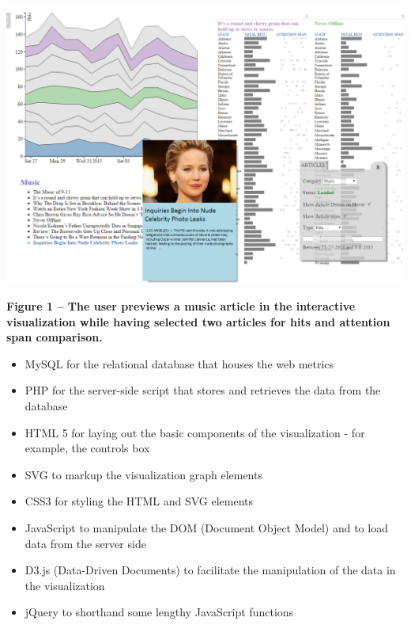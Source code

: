 \documentclass[12pt]{article}
\begin{document}
\noindent\includegraphics[scale=0.4]{img/in_action} \\

\begin{singlespace}
\noindent\textbf{Figure 1 -- The user previews a music article in the interactive visualization while having selected two articles for hits and attention span comparison.}
\end{singlespace}

\newpage

\iffalse

\begin{itemize}
\item MySQL for the relational database that houses the web metrics
\item PHP for the server-side script that stores and retrieves the data from the database
\item HTML 5 for laying out the basic components of the visualization - for example, the controls box
\item SVG to markup the visualization graph elements
\item CSS3 for styling the HTML and SVG elements
\item JavaScript to manipulate the DOM (Document Object Model) and to load data from the server side
\item D3.js (Data-Driven Documents) to facilitate the manipulation of the data in the visualization
\item jQuery to shorthand some lengthy JavaScript functions
\end{itemize}
\end{document}
